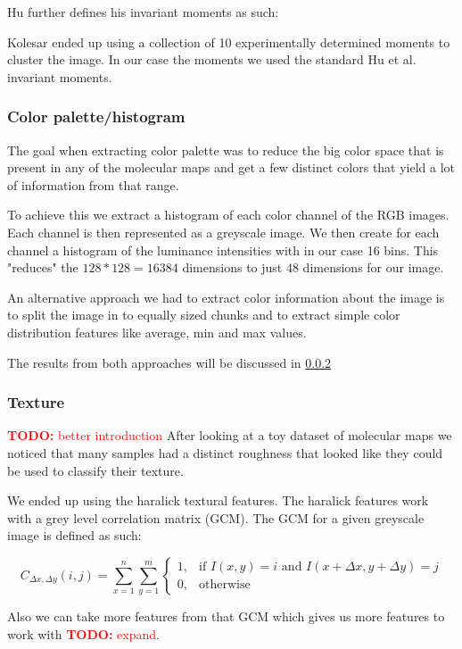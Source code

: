 \documentclass[journal]{vgtc}       %
\newcommand{\todo}[1]{\textcolor{red}{\textbf{TODO:} #1}}
\begin{document}
Hu further defines his invariant moments as such:




Kolesar ended up using a collection of 10 experimentally determined moments to cluster the image. In our case the moments we used the standard Hu et al. invariant moments. 

\subsubsection{Color palette/histogram }

The goal when extracting color palette was to reduce the big color space that is present in any of the molecular maps and get a few distinct  colors that yield a lot of information from that range.

To achieve this we extract a histogram of each color channel of the RGB images. Each channel is then represented as a greyscale image. We then create for each channel a histogram of the luminance intensities with in our case 16 bins. This "reduces" the \(128*128 = 16384\) dimensions to just \(48\) dimensions for our image.

An alternative approach we had to extract color information about the image is to split the image in to equally sized chunks and to extract simple color distribution features like average, min and max values.

The results from both approaches will be discussed in \ref{}

\subsubsection{Texture}
\todo{better introduction}
After looking at a toy dataset of molecular maps we noticed that many samples had a distinct roughness that looked like they could be used to classify their texture.

We ended up using the haralick textural features. The haralick features work with a grey level correlation matrix (GCM). The GCM for a given greyscale image is defined as such:

\[{\displaystyle C_{\Delta x,\Delta y}(i,j)=\sum _{x=1}^{n}\sum _{y=1}^{m}{\begin{cases}1,&{\text{if }}I(x,y)=i{\text{ and }}I(x+\Delta x,y+\Delta y)=j\\0,&{\text{otherwise}}\end{cases}}}\]

Also we can take more features from that GCM which gives us more features to work with \todo{expand}.
\end{document}
